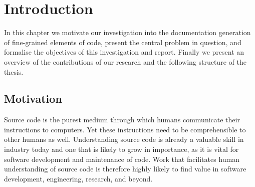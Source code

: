 \chapter{Introduction}
\label{chapterlabel1}




In this chapter we motivate our investigation into the documentation generation of fine-grained elements of code, present the central problem in question, and formalise the objectives of this investigation and report. 
Finally we present an overview of the contributions of our research and the following structure of the thesis.



\section{Motivation} %
\label{sec:motivation}

Source code is the purest medium through which humans communicate their instructions to computers.
Yet these instructions need to be comprehensible to other humans as well.
Understanding source code is already a valuable skill in industry today and one that is likely to grow in importance, as it is vital for software development and maintenance of code.
Work that facilitates human understanding of source code is therefore highly likely to find value in software development, engineering, research, and beyond. 

